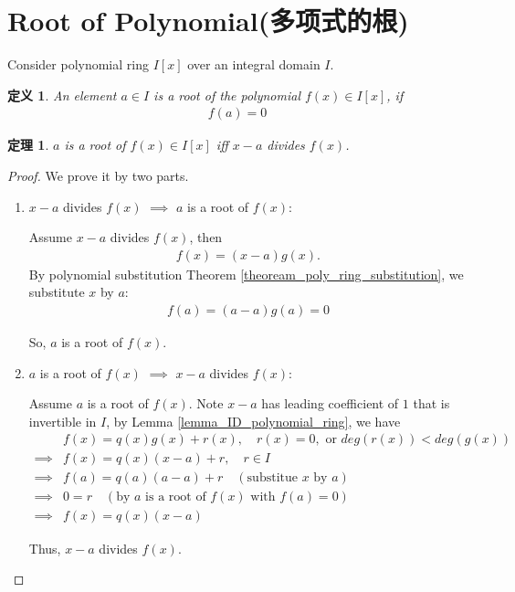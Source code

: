 \documentclass[utf8]{ctexbook}
\newtheorem{theorem}{定理}[section]
\newtheorem{definition}{定义}[section]
\begin{document}
\section{Root of Polynomial(多项式的根)}

Consider polynomial ring $I[x]$ over an integral domain $I$. 

\begin{definition}
\label{def_poly_root}
An element $a \in I$ is a root of the polynomial $f(x) \in I[x]$, if 
\begin{align*}
f(a) = 0
\end{align*}
\end{definition}

\begin{theorem}
\label{theorem_root_poly_1}
$a $ is a root of $f(x) \in I[x]$ iff $x-a$ divides $f(x)$.
\end{theorem}

\begin{proof}
We prove it by two parts.
\begin{enumerate}
\item{$x-a$ divides $f(x)$ $\implies$ $a$ is a root of $f(x)$:

Assume $x-a$ divides $f(x)$, then
\begin{align*}
f(x) = (x-a) g(x) .
\end{align*}
By polynomial substitution Theorem \ref{theoream_poly_ring_substitution}, we substitute $x$ by $a$:
\begin{align*}
f(a) = (a-a) g(a) = 0
\end{align*}

So, $a$ is a root of $f(x)$.
}
\item{$a$ is a root of $f(x)$ $\implies$ $x-a$ divides $f(x)$:  

Assume $a$ is a root of $f(x)$. Note $x-a$ has leading coefficient of $1$ that is invertible in $I$, by Lemma \ref{lemma_ID_polynomial_ring}, we have
\begin{align*}
& f(x) = q(x) g(x) + r(x) , \quad r(x) =0, \mbox{ or } deg(r(x)) < deg(g(x)) \\
\implies & f(x) = q(x) (x-a) + r , \quad r \in I \\
\implies & f(a) = q(a) (a-a) + r \quad (\mbox{substitue $x$ by $a$}) \\
\implies & 0 = r \quad (\mbox{by $a$ is a root of $f(x)$ with } f(a) = 0) \\
\implies & f(x) = q(x) (x-a)
\end{align*}

Thus, $x-a$ divides $f(x)$.
}
\end{enumerate}
\end{proof}
\end{document}
